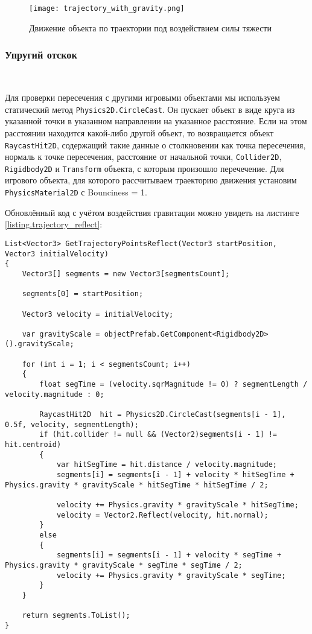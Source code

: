 \begin{figure}[h]
	\noindent\centering
	\texttt{[image: trajectory\_with\_gravity.png]}  
	\caption{Движение объекта по траектории под воздействием силы тяжести}
	\label{picture.trajectory_with_gravity}
\end{figure}

\subsubsection{Упругий отскок}~

Для проверки пересечения с другими игровыми объектами мы используем статический метод \lstinline|Physics2D.CircleCast|. Он пускает объект в виде круга из указанной точки в указанном направлении на указанное расстояние. Если на этом расстоянии находится какой-либо другой объект, то возвращается объект \lstinline|RaycastHit2D|, содержащий такие данные о столкновении как точка пересечения, нормаль к точке пересечения, расстояние от начальной точки, \lstinline|Collider2D|, \lstinline|Rigidbody2D| и \lstinline|Transform| объекта, с которым произошло перечечение. Для игрового объекта, для которого рассчитываем траекторию движения установим \lstinline|PhysicsMaterial2D| с Bounciness = 1.

Обновлённый код с учётом воздействия гравитации можно увидеть на листинге \ref{listing.trajectory_reflect}:

\begin{lstlisting}[style=fsharpstyle, caption={Построение траектории движущегося объекта c учётом упругих отскоков от других объектов}, label=listing.trajectory_reflect]
List<Vector3> GetTrajectoryPointsReflect(Vector3 startPosition, Vector3 initialVelocity)
{
	Vector3[] segments = new Vector3[segmentsCount];
	
	segments[0] = startPosition;
	
	Vector3 velocity = initialVelocity;
	
	var gravityScale = objectPrefab.GetComponent<Rigidbody2D>().gravityScale;
	
	for (int i = 1; i < segmentsCount; i++)
	{
		float segTime = (velocity.sqrMagnitude != 0) ? segmentLength / velocity.magnitude : 0;
		
		RaycastHit2D  hit = Physics2D.CircleCast(segments[i - 1], 0.5f, velocity, segmentLength);
		if (hit.collider != null && (Vector2)segments[i - 1] != hit.centroid)
		{
			var hitSegTime = hit.distance / velocity.magnitude;
			segments[i] = segments[i - 1] + velocity * hitSegTime + Physics.gravity * gravityScale * hitSegTime * hitSegTime / 2;
			
			velocity += Physics.gravity * gravityScale * hitSegTime;
			velocity = Vector2.Reflect(velocity, hit.normal);
		}
		else
		{
			segments[i] = segments[i - 1] + velocity * segTime + Physics.gravity * gravityScale * segTime * segTime / 2;
			velocity += Physics.gravity * gravityScale * segTime;
		}
	}
	
	return segments.ToList();
}
\end{lstlisting}

